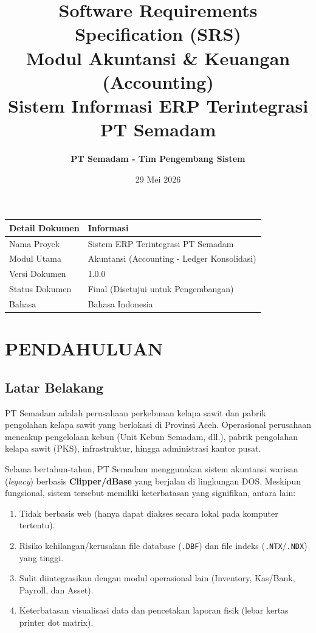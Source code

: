 \documentclass[11pt,a4paper]{article}
\title{
    \vspace{-1.5cm}
    \color{primarycolor}\textbf{\Huge Software Requirements Specification (SRS)}\\
    \vspace{0.3cm}
    \color{secondarycolor}\Large\textbf{Modul Akuntansi \& Keuangan (Accounting)}\\
    \vspace{0.2cm}
    \large\textbf{Sistem Informasi ERP Terintegrasi PT Semadam}
}
\author{\textbf{PT Semadam - Tim Pengembang Sistem}}
\date{29 Mei 2026}
\begin{document}
\maketitle

\thispagestyle{empty}
\begin{center}
    \vspace{1.5cm}
    \begin{tabular}{ll}
        \toprule
        \textbf{Detail Dokumen} & \textbf{Informasi} \\
        \midrule
        Nama Proyek & Sistem ERP Terintegrasi PT Semadam \\
        Modul Utama & Akuntansi (Accounting - Ledger Konsolidasi) \\
        Versi Dokumen & 1.0.0 \\
        Status Dokumen & Final (Disetujui untuk Pengembangan) \\
        Bahasa & Bahasa Indonesia \\
        \bottomrule
    \end{tabular}
\end{center}

\newpage
\tableofcontents
\newpage

\section{PENDAHULUAN}

\subsection{Latar Belakang}
PT Semadam adalah perusahaan perkebunan kelapa sawit dan pabrik pengolahan kelapa sawit yang berlokasi di Provinsi Aceh. Operasional perusahaan mencakup pengelolaan kebun (Unit Kebun Semadam, dll.), pabrik pengolahan kelapa sawit (PKS), infrastruktur, hingga administrasi kantor pusat. 

Selama bertahun-tahun, PT Semadam menggunakan sistem akuntansi warisan (\textit{legacy}) berbasis \textbf{Clipper/dBase} yang berjalan di lingkungan DOS. Meskipun fungsional, sistem tersebut memiliki keterbatasan yang signifikan, antara lain:
\begin{enumerate}
    \item Tidak berbasis web (hanya dapat diakses secara lokal pada komputer tertentu).
    \item Risiko kehilangan/kerusakan file database (\texttt{.DBF}) dan file indeks (\texttt{.NTX}/\texttt{.NDX}) yang tinggi.
    \item Sulit diintegrasikan dengan modul operasional lain (Inventory, Kas/Bank, Payroll, dan Asset).
    \item Keterbatasan visualisasi data dan pencetakan laporan fisik (lebar kertas printer dot matrix).
\end{enumerate}
\end{document}
